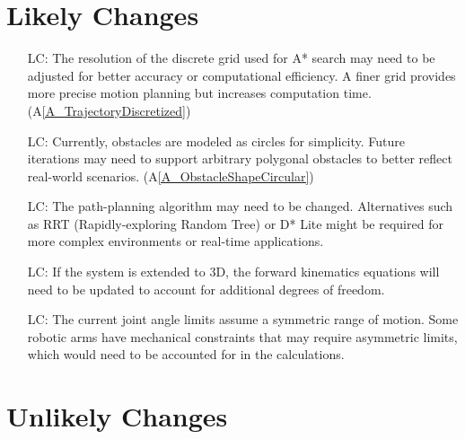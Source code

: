 \documentclass[12pt]{article}
\newcommand{\aref}[1]{A\ref{#1}}
\newcounter{lcnum} %
\begin{document}
  \section{Likely Changes}    

  \noindent \begin{itemize}

  \item[LC\refstepcounter{lcnum}\thelcnum\label{LC_GridResolution}:]  
  The resolution of the discrete grid used for A* search may need to be adjusted for better accuracy or computational efficiency. A finer grid provides more precise motion planning but increases computation time. (\aref{A_TrajectoryDiscretized})

  \item[LC\refstepcounter{lcnum}\thelcnum\label{LC_ObstacleShapes}:]  
  Currently, obstacles are modeled as circles for simplicity. Future iterations may need to support arbitrary polygonal obstacles to better reflect real-world scenarios. (\aref{A_ObstacleShapeCircular})

  \item[LC\refstepcounter{lcnum}\thelcnum\label{LC_PathPlanningAlgorithm}:]  
  The path-planning algorithm may need to be changed. Alternatives such as RRT (Rapidly-exploring Random Tree) or D* Lite might be required for more complex environments or real-time applications. 

  \item[LC\refstepcounter{lcnum}\thelcnum\label{LC_Kinematics}:]  
  If the system is extended to 3D, the forward kinematics equations will need to be updated to account for additional degrees of freedom. 

  \item[LC\refstepcounter{lcnum}\thelcnum\label{LC_JointLimits}:]  
  The current joint angle limits assume a symmetric range of motion. Some robotic arms have mechanical constraints that may require asymmetric limits, which would need to be accounted for in the calculations.

  \end{itemize}

  \section{Unlikely Changes}    
\end{document}

